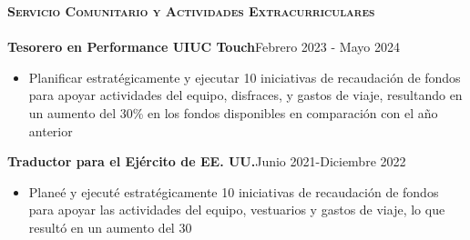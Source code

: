 \documentclass[a4paper]{article}
\newcommand{\lineunder} {
    \vspace*{-8pt} \\
    \hspace*{-18pt} \hrulefill \\
}
\newcommand{\header} [1] {
    {\hspace*{-18pt}\vspace*{6pt} \textsc{#1}}
    \vspace*{-6pt} \lineunder
}
\begin{document}
\vspace{1mm}


\header{\textbf{Servicio Comunitario y Actividades Extracurriculares}}

\textbf{Tesorero en Performance UIUC Touch}\hfill Febrero 2023 - Mayo 2024\\
\begin{itemize}[nolistsep]
    \item Planificar estratégicamente y ejecutar 10 iniciativas de recaudación 
    de fondos para apoyar actividades del equipo, disfraces,
    y gastos de viaje, resultando en un aumento del 30\% 
    en los fondos disponibles en comparación con el año anterior
\end{itemize}

{\textbf{Traductor para el Ejército de EE. UU.}\hfill{Junio 2021-Diciembre 2022}}\\
\begin{itemize}[nolistsep]
    \item Planeé y ejecuté estratégicamente 10 iniciativas de recaudación de fondos para apoyar las actividades del equipo, vestuarios y gastos de viaje, lo que resultó en un aumento del 30%
    \end{itemize}

\vspace*{1mm}
\end{document}
